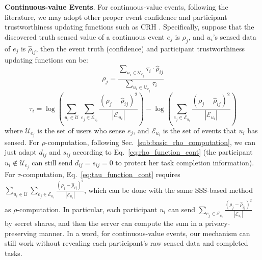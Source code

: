 \documentclass[11pt]{article}
\begin{document}
\noindent \textbf{Continuous-value Events}. For continuous-value events, following the literature, we may adopt other proper event confidence and participant trustworthiness updating functions such as CRH \cite{Leye-Xu2019EfficientAP,Leye-Zheng2020PrivacyAwareAE}. Specifically, suppose that the discovered truth sensed value of a continuous event $e_j$ is $\rho_j$, and $u_i$'s sensed data of $e_j$ is $\hat \rho_{ij}$, then the event truth (confidence) and participant trustworthiness updating functions  can be:
\begin{equation}
	\rho_j = \frac{\sum_{u_i \in \mathcal U_{e_j}}\tau_i \cdot \hat \rho_{ij}}{\sum_{u_i \in \mathcal U_{e_j}}\tau_i}
	\label{eq:rho_function_cont}
\end{equation}
\begin{equation}
	\tau_i = \log(\sum_{u_i \in \mathcal U} \sum_{e_j \in \mathcal E_{u_i}} \frac{(\rho_j- \hat \rho_{ij})^2}{|\mathcal E_{u_i}|}) - \log(\sum_{e_j \in \mathcal E_{u_i}} \frac{(\rho_j- \hat \rho_{ij})^2}{|\mathcal E_{u_i}|})
	\label{eq:tau_function_cont}
\end{equation}
where $\mathcal U_{e_j}$ is the set of users who sense $e_j$, and $\mathcal E_{u_i}$ is the set of events that $u_i$ has sensed. For $\rho$-computation, following Sec.~\ref{sub:basic_rho_computation}, we can just adapt $d_{ij}$ and $s_{ij}$ according to Eq.~\ref{eq:rho_function_cont} (the participant $u_i \not \in \mathcal U_{e_j}$ can still send $d_{ij}=s_{ij}=0$ to protect her task completion information). For $\tau$-computation, Eq.~\ref{eq:tau_function_cont} requires $\sum_{u_i \in \mathcal U} \sum_{e_j \in \mathcal E_{u_i}} \frac{(\rho_j- \hat \rho_{ij})^2}{|\mathcal E_{u_i}|}$, which can be done with the same SSS-based method as $\rho$-computation. In particular, each participant $u_i$ can send $\sum_{e_j \in \mathcal E_{u_i}} \frac{(\rho_j- \hat \rho_{ij})^2}{|\mathcal E_{u_i}|}$ by secret shares, and then the server can compute the sum in a privacy-preserving manner. In a word, for continuous-value events, our mechanism can still work without revealing each participant's raw sensed data and completed tasks.







\end{document}
